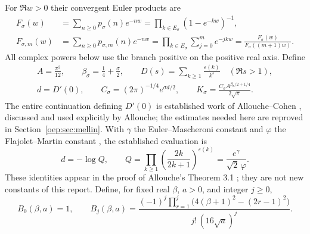 \documentclass[11pt,letterpaper]{article}
\theoremstyle{remark}\newtheorem{remark}[theorem]{Remark}
\newcommand{\eps}{\varepsilon}
\begin{document}
For $\Re w>0$ their convergent Euler products are
\begin{align}
 F_\sigma(w)&=\sum_{n\geq0}p_\sigma(n)e^{-nw}
   =\prod_{k\in E_\sigma}(1-e^{-kw})^{-1},\label{oep:eq:products}\\
 F_{\sigma,m}(w)&=\sum_{n\geq0}p_{\sigma,m}(n)e^{-nw}
   =\prod_{k\in E_\sigma}\sum_{j=0}^{m}e^{-jkw}
   =\frac{F_\sigma(w)}{F_\sigma((m+1)w)}.\label{oep:eq:capproduct}
\end{align}
All complex powers below use the branch positive on the positive real axis.
Define
\begin{gather}
 A=\frac{\pi^2}{12},\qquad \beta_\sigma=\frac14+\frac\sigma2,
 \qquad D(s)=\sum_{k\geq1}\frac{\eps(k)}{k^s}\quad(\Re s>1),\label{oep:eq:constants1}\\
 d=D'(0),\qquad C_\sigma=(2\pi)^{-1/4}e^{\sigma d/2},\qquad
 K_\sigma=\frac{C_\sigma A^{\beta_\sigma/2+1/4}}{2\sqrt\pi}.\label{oep:eq:constants2}
\end{gather}
The entire continuation defining $D'(0)$ is established work of Allouche--Cohen \cite{allouchecohen}, discussed and used explicitly by Allouche; the estimates needed here are reproved in Section~\ref{oep:sec:mellin}. With $\gamma$ the Euler--Mascheroni constant and $\varphi$ the Flajolet--Martin constant \cite{flajoletmartin}, the established evaluation is
\begin{equation}\label{oep:eq:Q}
 d=-\log Q,\qquad Q=\prod_{k\geq1}\left(\frac{2k}{2k+1}\right)^{\eps(k)}
   =\frac{e^\gamma}{\sqrt2\,\varphi}.
\end{equation}
These identities appear in the proof of Allouche's Theorem 3.1 \cite{allouche2019}; they are not new constants of this report. Define, for fixed real $\beta$, $a>0$, and integer $j\geq0$,
\begin{equation}\label{oep:eq:Bj}
 B_0(\beta,a)=1,\qquad
 B_j(\beta,a)=\frac{(-1)^j\prod_{r=1}^{j}\bigl(4(\beta+1)^2-(2r-1)^2\bigr)}
 {j!\,(16\sqrt a)^j}.
\end{equation}
\end{document}
